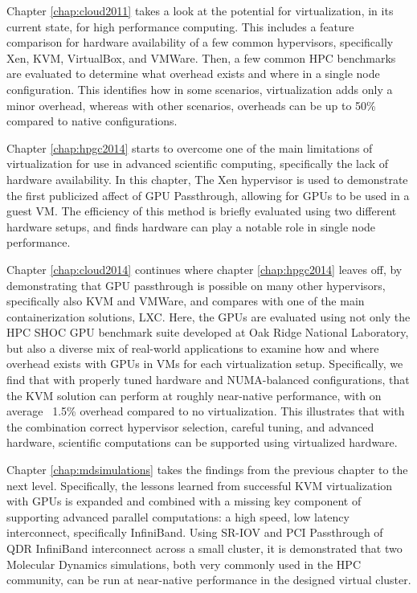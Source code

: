 Chapter \ref{chap:cloud2011} takes a look at the potential for virtualization, in its current state, for high performance computing. This includes a feature comparison for hardware availability of a few common hypervisors, specifically Xen, KVM, VirtualBox, and VMWare. Then, a few common HPC benchmarks are evaluated to determine what overhead exists and where in a single node configuration. This identifies how in some scenarios, virtualization adds only a minor overhead, whereas with other scenarios, overheads can be up to 50\% compared to native configurations. 

Chapter \ref{chap:hpgc2014} starts to overcome one of the main limitations of virtualization for use in advanced scientific computing, specifically the lack of hardware availability. In this chapter, The Xen hypervisor is used to demonstrate the first publicized affect of GPU Passthrough, allowing for GPUs to be used in a guest VM. The efficiency of this method is briefly evaluated using two different hardware setups, and finds hardware can play a notable role in single node performance. 

Chapter \ref{chap:cloud2014} continues where chapter \ref{chap:hpgc2014} leaves off, by demonstrating that GPU passthrough is possible on many other hypervisors, specifically also KVM and VMWare, and compares with one of the main containerization solutions, LXC. Here, the GPUs are evaluated using not only the HPC SHOC GPU benchmark suite developed at Oak Ridge National Laboratory, but also a diverse mix of real-world applications to examine how and where overhead exists with GPUs in VMs for each virtualization setup.  Specifically, we find that with properly tuned hardware and NUMA-balanced configurations, that the KVM solution can perform at roughly near-native performance, with on average ~1.5\% overhead compared to no virtualization. This illustrates that with the combination correct hypervisor selection, careful tuning, and advanced hardware, scientific computations can be supported using virtualized hardware. 

Chapter \ref{chap:mdsimulations} takes the findings from the previous chapter to the next level. Specifically, the lessons learned from successful KVM virtualization with GPUs is expanded and combined with a missing key component of supporting advanced parallel computations: a high speed, low latency interconnect, specifically InfiniBand. Using SR-IOV and PCI Passthrough of QDR InfiniBand interconnect across a small cluster, it is demonstrated that two Molecular Dynamics simulations, both very commonly used in the HPC community, can be run at near-native performance in the designed virtual cluster.

